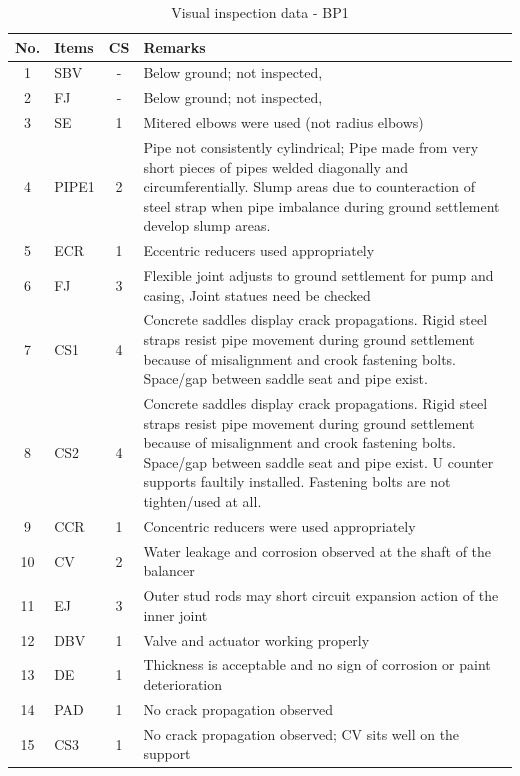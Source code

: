 
\begin{table}[!htb]
	\caption{Visual inspection data - BP1}
	\label{ch04_visualinspectionbp1}
		{\scriptsize
\begin{tabular}{c|l|c|p{12cm}}
	\hline
	No. & Items & CS & Remarks \\ 
	\hline
	1 & SBV & - & Below ground; not inspected,  \\ 
	2 & FJ & - & Below ground; not inspected, \\ 
	3 & SE & 1 & Mitered elbows were used (not radius elbows) \\ 
	4 & PIPE1 & 2 & Pipe not consistently cylindrical; Pipe made from very short pieces of pipes welded diagonally and circumferentially. Slump areas due to counteraction of steel strap when pipe imbalance during ground settlement develop slump areas. \\ 
	5 & ECR & 1 & Eccentric reducers used appropriately \\ 
	6 & FJ & 3 & Flexible joint adjusts to ground settlement for pump and casing, Joint statues need be checked \\ 
	7 & CS1 & 4 & Concrete saddles display crack propagations. Rigid steel straps resist pipe movement during ground settlement because of misalignment and crook fastening bolts. Space/gap between saddle seat and pipe exist. \\ 
	8 & CS2 & 4 & Concrete saddles display crack propagations. Rigid steel straps resist pipe movement during ground settlement because of misalignment and crook fastening bolts. Space/gap between saddle seat and pipe exist. U counter supports faultily installed. Fastening bolts are not tighten/used at all. \\ 
	9 & CCR & 1 & Concentric reducers were used appropriately \\ 
	10 & CV & 2 & Water leakage and corrosion observed at the shaft of the balancer \\ 
	11 & EJ & 3 & Outer stud rods may short circuit expansion action of the inner joint \\ 
	12 & DBV & 1 & Valve and actuator working properly  \\ 
	13 & DE & 1 & Thickness is acceptable and no sign of corrosion or paint deterioration \\ 
	14 & PAD & 1 & No crack propagation observed \\ 
	15 & CS3 & 1 & No crack propagation observed; CV sits well on the support  \\ 
	\hline
\end{tabular}
	}
\end{table}


